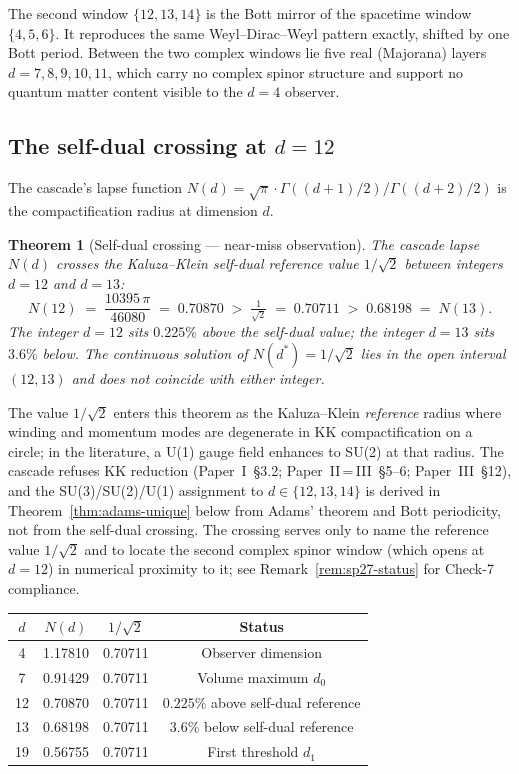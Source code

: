 \documentclass[12pt,a4paper]{article}
\newtheorem{theorem}{Theorem}[section]
\begin{document}
The second window $\{12,13,14\}$ is the Bott mirror of the spacetime window $\{4,5,6\}$.
It reproduces the same Weyl--Dirac--Weyl pattern exactly, shifted by one Bott period.
Between the two complex windows lie five real (Majorana) layers $d=7,8,9,10,11$, which
carry no complex spinor structure and support no quantum matter content visible to the $d=4$
observer.

\subsection{The self-dual crossing at \texorpdfstring{$d=12$}{d=12}}

The cascade's lapse function $N(d)=\sqrt{\pi}\cdot\Gamma((d+1)/2)/\Gamma((d+2)/2)$ is the
compactification radius at dimension $d$.

\begin{theorem}[Self-dual crossing --- near-miss observation]\label{thm:self-dual}
The cascade lapse $N(d)$ crosses the Kaluza--Klein self-dual reference
value $1/\sqrt{2}$ between integers $d=12$ and $d=13$:
\[
N(12) \;=\; \frac{10395\,\pi}{46080} \;=\; 0.70870
\;>\; \tfrac{1}{\sqrt{2}} \;=\; 0.70711
\;>\; 0.68198 \;=\; N(13).
\]
The integer $d=12$ sits $0.225\%$ above the self-dual value; the integer
$d=13$ sits $3.6\%$ below. The continuous solution of
$N(d^*) = 1/\sqrt{2}$ lies in the open interval $(12,13)$ and does not
coincide with either integer.
\end{theorem}

The value $1/\sqrt{2}$ enters this theorem as the Kaluza--Klein
\emph{reference} radius where winding and momentum modes are degenerate
in KK compactification on a circle; in the literature, a U(1) gauge
field enhances to SU(2) at that radius. The cascade refuses KK
reduction (Paper~I~\S3.2; Paper~II\,=\,III~\S5--6; Paper~III~\S12), and
the SU(3)/SU(2)/U(1) assignment to $d\in\{12,13,14\}$ is derived in
Theorem~\ref{thm:adams-unique} below from Adams' theorem and Bott
periodicity, not from the self-dual crossing. The crossing serves only
to name the reference value $1/\sqrt{2}$ and to locate the second
complex spinor window (which opens at $d=12$) in numerical proximity to
it; see Remark~\ref{rem:sp27-status} for Check-7 compliance.

\begin{center}
\begin{tabular}{cccc}
\toprule
$d$ & $N(d)$ & $1/\sqrt{2}$ & Status \\
\midrule
4   & 1.17810 & 0.70711 & Observer dimension \\
7   & 0.91429 & 0.70711 & Volume maximum $d_0$ \\
12  & 0.70870 & 0.70711 & $0.225\%$ above self-dual reference \\
13  & 0.68198 & 0.70711 & $3.6\%$ below self-dual reference \\
19  & 0.56755 & 0.70711 & First threshold $d_1$ \\
\bottomrule
\end{tabular}
\end{center}
\end{document}
